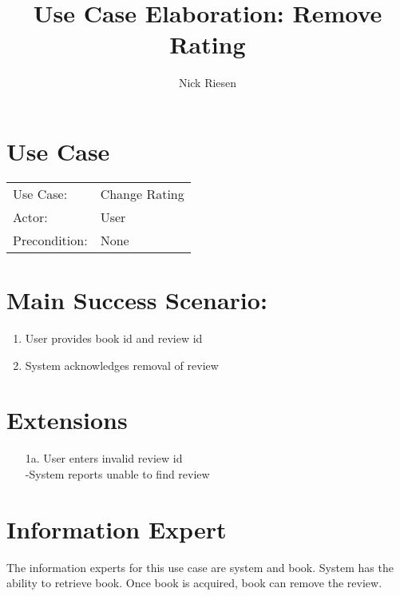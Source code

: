 \documentclass{article}
\title{Use Case Elaboration: Remove Rating}
\author{ Nick Riesen }
\begin{document}
\maketitle


\section*{Use Case}
\begin{tabular}{l l}
Use Case:     & Change Rating                 \\
Actor:        & User                          \\
Precondition: & None                          \\
\end{tabular}


\section*{Main Success Scenario:}

\begin{enumerate}
    \item  User provides book id and review id
    \item System acknowledges removal of review

\end{enumerate}

\section*{Extensions}

\begin{itemize}
    \item [1a.] User enters invalid review id \\
        -System reports unable to find review

\end{itemize}

\section*{Information Expert}

The information experts for this use case are system and book. System has the ability to retrieve book. Once book is acquired, book can remove the review.
\end{document}
